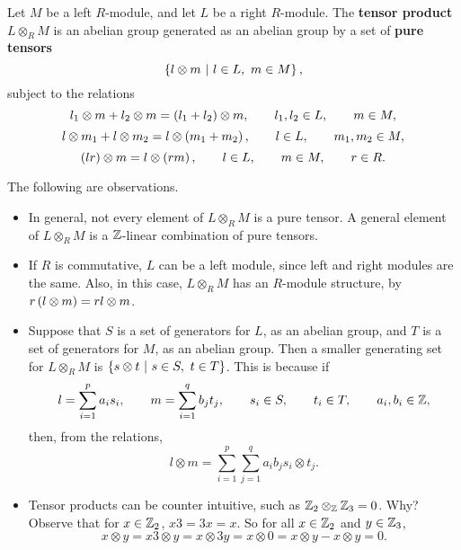 \begin{definition}
Let $ M $ be a left $ R $-module, and let $ L $ be a right $ R $-module. The \textbf{tensor product} $ L \otimes_R M $ is an abelian group generated as an abelian group by a set of \textbf{pure tensors}
$$ \cbr{l \otimes m \st l \in L, \ m \in M}, $$
subject to the relations
$$ l_1 \otimes m + l_2 \otimes m = \br{l_1 + l_2} \otimes m, \qquad l_1, l_2 \in L, \qquad m \in M, $$
$$ l \otimes m_1 + l \otimes m_2 = l \otimes \br{m_1 + m_2}, \qquad l \in L, \qquad m_1, m_2 \in M, $$
$$ \br{lr} \otimes m = l \otimes \br{rm}, \qquad l \in L, \qquad m \in M, \qquad r \in R. $$
\end{definition}

The following are observations.
\begin{itemize}
\item In general, not every element of $ L \otimes_R M $ is a pure tensor. A general element of $ L \otimes_R M $ is a $ \mathbb{Z} $-linear combination of pure tensors.
\item If $ R $ is commutative, $ L $ can be a left module, since left and right modules are the same. Also, in this case, $ L \otimes_R M $ has an $ R $-module structure, by $ r\br{l \otimes m} = rl \otimes m $.
\item Suppose that $ S $ is a set of generators for $ L $, as an abelian group, and $ T $ is a set of generators for $ M $, as an abelian group. Then a smaller generating set for $ L \otimes_R M $ is $ \cbr{s \otimes t \st s \in S, \ t \in T} $. This is because if
$$ l = \sum_{i = 1}^p a_is_i, \qquad m = \sum_{i = 1}^q b_jt_j, \qquad s_i \in S, \qquad t_i \in T, \qquad a_i, b_i \in \mathbb{Z}, $$
then, from the relations,
$$ l \otimes m = \sum_{i = 1}^p \sum_{j = 1}^q a_ib_js_i \otimes t_j. $$

\pagebreak

\item Tensor products can be counter intuitive, such as $ \mathbb{Z}_2 \otimes_{\mathbb{Z}} \mathbb{Z}_3 = 0 $. Why? Observe that for $ x \in \mathbb{Z}_2 $, $ x3 = 3x = x $. So for all $ x \in \mathbb{Z}_2 $ and $ y \in \mathbb{Z}_3 $,
$$ x \otimes y = x3 \otimes y = x \otimes 3y = x \otimes 0 = x \otimes y - x \otimes y = 0. $$
\end{itemize}

